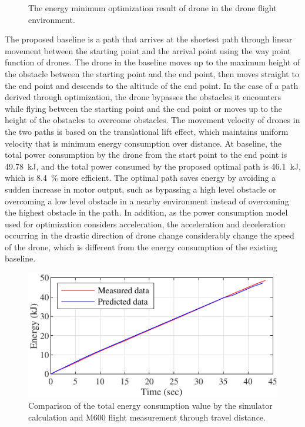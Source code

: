 \documentclass[journal]{./template/IEEEtran}
\begin{document}
\begin{figure}[ht]
\centering
{}
\qquad
{}
\caption{The energy minimum optimization result of drone in the drone flight environment.}
\label{fig: opt_environ}
\end{figure}

The proposed baseline is a path that arrives at the shortest path through linear movement between the starting point and the arrival point using the way point function of drones. The drone in the baseline moves up to the maximum height of the obstacle between the starting point and the end point, then moves straight to the end point and descends to the altitude of the end point. 
In the case of a path derived through optimization, the drone bypasses the obstacles it encounters while flying between the starting point and the end point or moves up to the height of the obstacles to overcome obstacles. 
The movement velocity of drones in the two paths is based on the translational lift effect, which maintains uniform velocity that is minimum energy consumption over distance. 
At baseline, the total power consumption by the drone from the start point to the end point is 49.78~kJ, and the total power consumed by the proposed optimal path is 46.1~kJ, which is 8.4~\% more efficient. The optimal path saves energy by avoiding a sudden increase in motor output, such as bypassing a high level obstacle or overcoming a low level obstacle in a nearby environment instead of overcoming the highest obstacle in the path.
In addition, as the power consumption model used for optimization considers acceleration, the acceleration and deceleration occurring in the drastic direction of drone change considerably change the speed of the drone, which is different from the energy consumption of the existing baseline.

\begin{figure}[ht]
\centering\includegraphics[scale=1.0]{fig14/S_E.pdf}
\caption{Comparison of the total energy consumption value by the simulator calculation and M600 flight measurement through travel distance.}
\label{fig:consumed_energy}
\end{figure}
\end{document}
